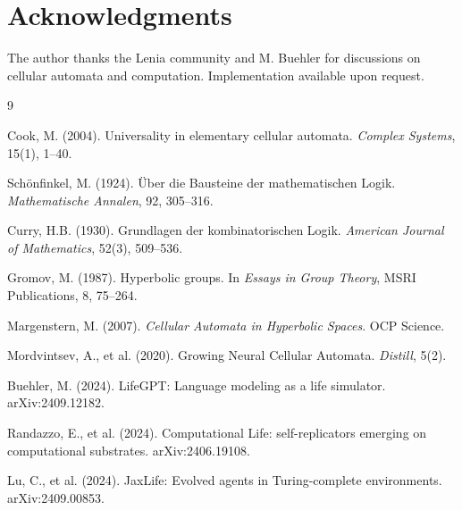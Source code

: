 \documentclass[11pt]{article}
\begin{document}
\section*{Acknowledgments}

The author thanks the Lenia community and M. Buehler for discussions on cellular automata and computation. Implementation available upon request.

\begin{thebibliography}{9}

Cook, M. (2004). Universality in elementary cellular automata. \textit{Complex Systems}, 15(1), 1--40.

Sch\"{o}nfinkel, M. (1924). \"{U}ber die Bausteine der mathematischen Logik. \textit{Mathematische Annalen}, 92, 305--316.

Curry, H.B. (1930). Grundlagen der kombinatorischen Logik. \textit{American Journal of Mathematics}, 52(3), 509--536.

Gromov, M. (1987). Hyperbolic groups. In \textit{Essays in Group Theory}, MSRI Publications, 8, 75--264.

Margenstern, M. (2007). \textit{Cellular Automata in Hyperbolic Spaces}. OCP Science.

Mordvintsev, A., et al. (2020). Growing Neural Cellular Automata. \textit{Distill}, 5(2).

Buehler, M. (2024). LifeGPT: Language modeling as a life simulator. arXiv:2409.12182.

Randazzo, E., et al. (2024). Computational Life: self-replicators emerging on computational substrates. arXiv:2406.19108.

Lu, C., et al. (2024). JaxLife: Evolved agents in Turing-complete environments. arXiv:2409.00853.

\end{thebibliography}
\end{document}
